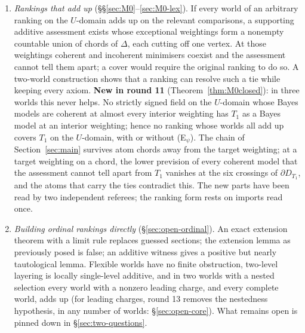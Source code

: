 \documentclass[11pt]{article}
\theoremstyle{definition}
\theoremstyle{remark}
\begin{document}
\begin{enumerate}[leftmargin=*]
\item \emph{Rankings that add up} (\S\S\ref{sec:M0}--\ref{sec:M0-lex}). If every world of an arbitrary ranking on the $U$-domain adds up on the relevant comparisons, a supporting additive assessment exists whose exceptional weightings form a nonempty countable union of chords of $\Delta$, each cutting off one vertex. At those weightings coherent and incoherent minimisers coexist and the assessment cannot tell them apart; a cover would require the original ranking to do so. A two-world construction shows that a ranking can resolve such a tie while keeping every axiom. \textbf{New in round 11} (Theorem~\ref{thm:M0closed}): in three worlds this never helps. No strictly signed field on the $U$-domain whose Bayes models are coherent at almost every interior weighting has $T_1$ as a Bayes model at an interior weighting; hence no ranking whose worlds all add up covers $T_1$ on the $U$-domain, with or without (E$_\psi$). The chain of Section~\ref{sec:main} survives atom chords away from the target weighting; at a target weighting on a chord, the lower prevision of every coherent model that the assessment cannot tell apart from $T_1$ vanishes at the six crossings of $\partial D_{T_1}$, and the atoms that carry the ties contradict this. The new parts have been read by two independent referees; the ranking form rests on imports read once.
\item \emph{Building ordinal rankings directly} (\S\ref{sec:open-ordinal}). An exact extension theorem with a limit rule replaces guessed sections; the extension lemma as previously posed is false; an additive witness gives a positive but nearly tautological lemma. Flexible worlds have no finite obstruction, two-level layering is locally single-level additive, and in two worlds with a nested selection every world with a nonzero leading charge, and every complete world, adds up (for leading charges, round 13 removes the nestedness hypothesis, in any number of worlds: \S\ref{sec:open-core}). What remains open is pinned down in \S\ref{sec:two-questions}.

\end{enumerate}
\end{document}
